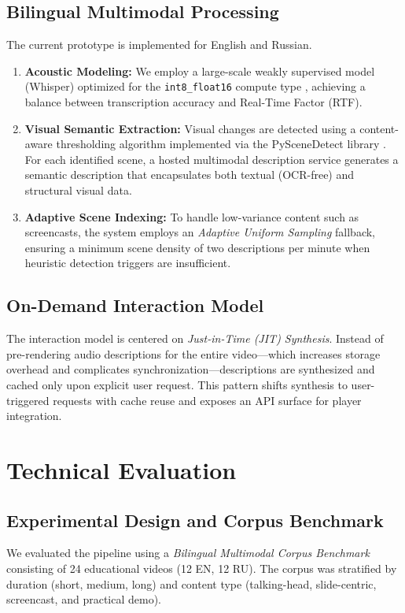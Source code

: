 \documentclass[conference]{IEEEtran}
\begin{document}
\subsection{Bilingual Multimodal Processing}
The current prototype is implemented for English and Russian.
\begin{enumerate}
\item \textbf{Acoustic Modeling:} We employ a large-scale weakly supervised model (Whisper) optimized for the \texttt{int8\_float16} compute type \cite{Radford2022}, achieving a balance between transcription accuracy and Real-Time Factor (RTF).
\item \textbf{Visual Semantic Extraction:} Visual changes are detected using a content-aware thresholding algorithm implemented via the PySceneDetect library \cite{PySceneDetect}. For each identified scene, a hosted multimodal description service generates a semantic description that encapsulates both textual (OCR-free) and structural visual data.
\item \textbf{Adaptive Scene Indexing:} To handle low-variance content such as screencasts, the system employs an \emph{Adaptive Uniform Sampling} fallback, ensuring a minimum scene density of two descriptions per minute when heuristic detection triggers are insufficient.
\end{enumerate}

\subsection{On-Demand Interaction Model}
The interaction model is centered on \emph{Just-in-Time (JIT) Synthesis}. Instead of pre-rendering audio descriptions for the entire video—which increases storage overhead and complicates synchronization—descriptions are synthesized and cached only upon explicit user request. This pattern shifts synthesis to user-triggered requests with cache reuse and exposes an API surface for player integration.

\section{Technical Evaluation}
\subsection{Experimental Design and Corpus Benchmark}
We evaluated the pipeline using a \emph{Bilingual Multimodal Corpus Benchmark} consisting of 24 educational videos (12 EN, 12 RU). The corpus was stratified by duration (short, medium, long) and content type (talking-head, slide-centric, screencast, and practical demo). 
\end{document}

